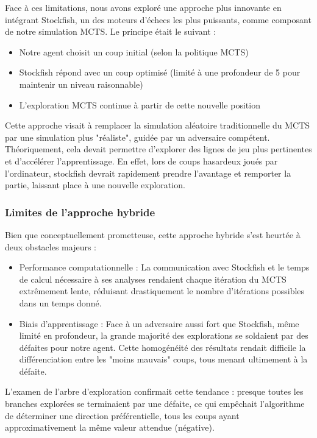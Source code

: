 \documentclass{article}
\begin{document}
    \quad Face à ces limitations, nous avons exploré une approche plus innovante en intégrant Stockfish, un des moteurs d'échecs les plus puissants, comme composant de notre simulation MCTS. Le principe était le suivant :
    \begin{itemize} 
        \item Notre agent choisit un coup initial (selon la politique MCTS)
        \item Stockfish répond avec un coup optimisé (limité à une profondeur de 5 pour maintenir un niveau raisonnable)
        \item L'exploration MCTS continue à partir de cette nouvelle position
    \end{itemize}
    
    Cette approche visait à remplacer la simulation aléatoire traditionnelle du MCTS par une simulation plus "réaliste", guidée par un adversaire compétent. Théoriquement, cela devait permettre d'explorer des lignes de jeu plus pertinentes et d'accélérer l'apprentissage. En effet, lors de coups hasardeux joués par l’ordinateur, stockfish devrait rapidement prendre l’avantage et remporter la partie, laissant place à une nouvelle exploration.\\

    \subsubsection{Limites de l'approche hybride}

    \quad Bien que conceptuellement prometteuse, cette approche hybride s'est heurtée à deux obstacles majeurs :
    \begin{itemize} 
        \item Performance computationnelle : La communication avec Stockfish et le temps de calcul nécessaire à ses analyses rendaient chaque itération du MCTS extrêmement lente, réduisant drastiquement le nombre d'itérations possibles dans un temps donné.
        \item Biais d'apprentissage : Face à un adversaire aussi fort que Stockfish, même limité en profondeur, la grande majorité des explorations se soldaient par des défaites pour notre agent. Cette homogénéité des résultats rendait difficile la différenciation entre les "moins mauvais" coups, tous menant ultimement à la défaite.
    \end{itemize}
    
    L'examen de l'arbre d'exploration confirmait cette tendance : presque toutes les branches explorées se terminaient par une défaite, ce qui empêchait l'algorithme de déterminer une direction préférentielle, tous les coups ayant approximativement la même valeur attendue (négative).\\
\end{document}
